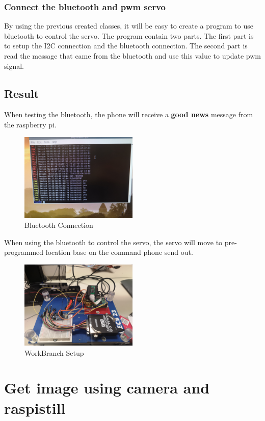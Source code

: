 \documentclass{article}
\begin{document}
\subsubsection{Connect the bluetooth and pwm servo}
By using the previous created classes, it will be easy to create a program to use bluetooth to control the servo.
The program contain two parts. The first part is to setup the I2C connection and the bluetooth connection. The second part is read the message that came from the bluetooth and use this value to update pwm signal.
\subsection{Result}
When testing the bluetooth, the phone will receive a \textbf{good news} message from the raspberry pi.
\begin{figure}[hb]
	\centering
	\includegraphics[width=0.5\textwidth]{img/Lab03_12.jpg}
	\caption{Bluetooth Connection} 
	\label{BBD}
\end{figure}
When using the bluetooth to control the servo, the servo will move to pre-programmed location base on the command phone send out. 
\begin{figure}[hb]
	\centering
	\includegraphics[width=0.5\textwidth]{img/Lab03_10.jpg}
	\caption{WorkBranch Setup} 
	\label{BBD}
\end{figure}
\clearpage

\section{Get image using camera and raspistill}
\end{document}
